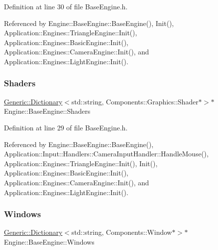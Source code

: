 Definition at line 30 of file Base\+Engine.\+h.



Referenced by Engine\+::\+Base\+Engine\+::\+Base\+Engine(), Init(), Application\+::\+Engines\+::\+Triangle\+Engine\+::\+Init(), Application\+::\+Engines\+::\+Basic\+Engine\+::\+Init(), Application\+::\+Engines\+::\+Camera\+Engine\+::\+Init(), and Application\+::\+Engines\+::\+Light\+Engine\+::\+Init().

\mbox{\label{classEngine_1_1BaseEngine_a2582dee3f73da82bb422b43317b85e3b}} 
\subsubsection{\texorpdfstring{Shaders}{Shaders}}
{\footnotesize\ttfamily \mbox{\hyperlink{classGeneric_1_1Dictionary}{Generic\+::\+Dictionary}}$<$std\+::string, Components\+::\+Graphics\+::\+Shader$\ast$$>$$\ast$ Engine\+::\+Base\+Engine\+::\+Shaders\hspace{0.3cm}{\ttfamily [inherited]}}



Definition at line 29 of file Base\+Engine.\+h.



Referenced by Engine\+::\+Base\+Engine\+::\+Base\+Engine(), Application\+::\+Input\+::\+Handlers\+::\+Camera\+Input\+Handler\+::\+Handle\+Mouse(), Application\+::\+Engines\+::\+Triangle\+Engine\+::\+Init(), Init(), Application\+::\+Engines\+::\+Basic\+Engine\+::\+Init(), Application\+::\+Engines\+::\+Camera\+Engine\+::\+Init(), and Application\+::\+Engines\+::\+Light\+Engine\+::\+Init().

\mbox{\label{classEngine_1_1BaseEngine_a4a1a4c4dae052e66ecc4f326eeed4d33}} 
\subsubsection{\texorpdfstring{Windows}{Windows}}
{\footnotesize\ttfamily \mbox{\hyperlink{classGeneric_1_1Dictionary}{Generic\+::\+Dictionary}}$<$std\+::string, Components\+::\+Window$\ast$$>$$\ast$ Engine\+::\+Base\+Engine\+::\+Windows\hspace{0.3cm}{\ttfamily [inherited]}}



